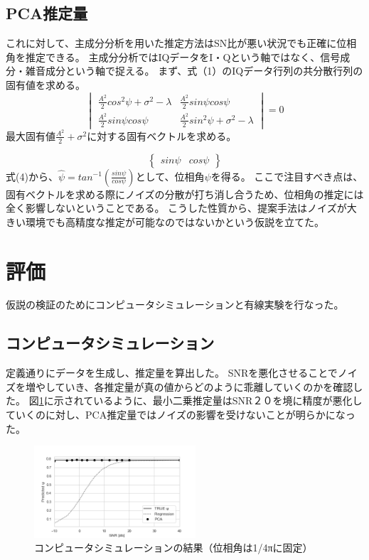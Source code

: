 \documentclass[a4j,10pt]{jsarticle}
\begin{document}
\subsection{PCA推定量}
これに対して、主成分分析を用いた推定方法はSN比が悪い状況でも正確に位相角を推定できる。
    主成分分析ではIQデータをI・Qという軸ではなく、信号成分・雑音成分という軸で捉える。
    まず、式（1）のIQデータ行列の共分散行列の固有値を求める。
    \begin{equation}
        \begin{vmatrix}
            \frac{A^2}{2} cos^2 \psi + \sigma^2 - \lambda & \frac{A^2}{2} sin\psi cos\psi \\ \frac{A^2}{2} sin\psi cos\psi & \frac{A^2}{2} sin^2 \psi + \sigma^2 - \lambda
        \end{vmatrix}
        = 0
    \end{equation}
    最大固有値$\frac{A^2}{2} + \sigma^2$に対する固有ベクトルを求める。

    \begin{equation}
        \begin{Bmatrix}
            sin\psi & cos\psi
        \end{Bmatrix}
    \end{equation}
    式(4)から、$\hat{\psi} = tan^{-1}(\frac{sin\psi}{cos\psi})$として、位相角$\psi$を得る。
ここで注目すべき点は、固有ベクトルを求める際にノイズの分散が打ち消し合うため、位相角の推定には全く影響しないということである。
こうした性質から、提案手法はノイズが大きい環境でも高精度な推定が可能なのではないかという仮説を立てた。

\section{評価}
仮説の検証のためにコンピュータシミュレーションと有線実験を行なった。

\subsection{コンピュータシミュレーション}
定義通りにデータを生成し、推定量を算出した。
SNRを悪化させることでノイズを増やしていき、各推定量が真の値からどのように乖離していくのかを確認した。
図\ref{simulation}に示されているように、最小二乗推定量はSNR２０を境に精度が悪化していくのに対し、PCA推定量ではノイズの影響を受けないことが明らかになった。

\begin{figure}[htbp]
    \begin{center}
        \includegraphics[width=6cm]{performance_comparison.png}
        \caption{コンピュータシミュレーションの結果（位相角は1/4πに固定）}
        \label{simulation}
    \end{center}
\end{figure}
\end{document}
